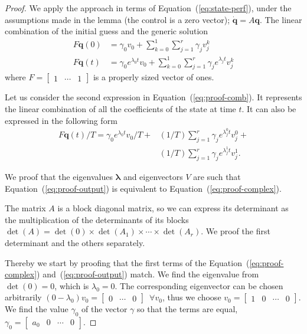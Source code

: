 \begin{proof}
We apply the approach in terms of Equation~(\ref{eq:state-perf}), under the assumptions made in the lemma (the control is a zero vector); $\dot{\mathbf{q}}=A\mathbf{q}$. The linear combination of the initial guess and the generic solution
\begin{equation}\label{eq:proof-comb}\begin{split}
  F\mathbf{q}(0)&=\gamma_0 v_0+\sum_{k=0}^{1}{\sum_{j=1}^{r}{\gamma_j v_j^k}}\\
  F\mathbf{q}(t)&=\gamma_0 e^{\lambda_0 t} v_0+\sum_{k=0}^{1}{\sum_{j=1}^{r}{\gamma_j e^{\lambda_j t} v_j^k}}
\end{split}\end{equation}
where $F=\begin{bmatrix}1 & \cdots & 1\end{bmatrix}$ is a properly sized vector of ones. 

Let us consider the second expression in Equation~(\ref{eq:proof-comb}). It represents the linear combination of all the coefficients of the state at time $t$. It can also be expressed in the following form
\begin{equation}\label{eq:proof-output}\begin{split}
  F\mathbf{q}(t)/T=\gamma_0 e^{\lambda_0t}v_0/T+&(1/T)\sum_{j=1}^r{\gamma_j e^{\lambda_j^0t}v_j^0}+\\&(1/T)\sum_{j=1}^r{\gamma_j e^{\lambda_j^1t}v_j^1}.
\end{split}\end{equation}

We proof that the eigenvalues $\mathbf{\lambda}$ and eigenvectors $V$ are such that Equation~(\ref{eq:proof-output}) is equivalent to Equation~(\ref{eq:proof-complex}).

The matrix $A$ is a block diagonal matrix, so we can express its determinant as the multiplication of the determinants of its blocks $\det{(A)}=\det{(0)}\times\det{(A_1)}\times\cdots\times\det{(A_r)}$. We proof the first determinant and the others separately.

Thereby we start by proofing that the first terms of the Equation~(\ref{eq:proof-complex}) and~(\ref{eq:proof-output}) match. We find the eigenvalue from $\det(0)=0$, which is $\lambda_0=0$. The corresponding eigenvector can be chosen arbitrarily $(0-\lambda_0)v_0=\begin{bmatrix} 0 & \cdots & 0 \end{bmatrix}\,\,\,\forall v_0$, thus we choose $v_0=\begin{bmatrix}1 & 0 & \cdots & 0\end{bmatrix}$. We find the value $\gamma_0$ of the vector $\gamma$ so that the terms are equal, $\gamma_0=\begin{bmatrix}a_0 & 0 & \cdots & 0\end{bmatrix}$. 


\end{proof}
